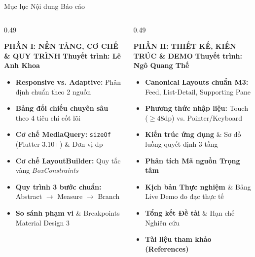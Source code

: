 \documentclass[aspectratio=169, 10pt]{beamer}
\begin{document}
\begin{frame}{Mục lục Nội dung Báo cáo}
  \vspace{-0.15cm}
  \begin{columns}[t,onlytextwidth]
    \begin{column}{0.49\textwidth}
      \begin{block}{\textbf{PHẦN I: NỀN TẢNG, CƠ CHẾ \& QUY TRÌNH}}
        \footnotesize
        \textbf{Thuyết trình: Lê Anh Khoa}
        \begin{itemize}\setlength{\itemsep}{1.8pt}
          \item \textbf{Responsive vs. Adaptive:} Phân định chuẩn theo 2 nguồn
          \item \textbf{Bảng đối chiếu chuyên sâu} theo 4 tiêu chí cốt lõi
          \item \textbf{Cơ chế MediaQuery:} \texttt{sizeOf} (Flutter 3.10+) \& Đơn vị dp
          \item \textbf{Cơ chế LayoutBuilder:} Quy tắc vàng \textit{BoxConstraints}
          \item \textbf{Quy trình 3 bước chuẩn:} Abstract $\rightarrow$ Measure $\rightarrow$ Branch
          \item \textbf{So sánh phạm vi} \& Breakpoints Material Design 3
        \end{itemize}
      \end{block}
    \end{column}

    \begin{column}{0.49\textwidth}
      \begin{block}{\textbf{PHẦN II: THIẾT KẾ, KIẾN TRÚC \& DEMO}}
        \footnotesize
        \textbf{Thuyết trình: Ngô Quang Thế}
        \begin{itemize}\setlength{\itemsep}{1.8pt}
          \item \textbf{Canonical Layouts chuẩn M3:} Feed, List-Detail, Supporting Pane
          \item \textbf{Phương thức nhập liệu:} Touch ($\ge 48\text{dp}$) vs. Pointer/Keyboard
          \item \textbf{Kiến trúc ứng dụng} \& Sơ đồ luồng quyết định 3 tầng
          \item \textbf{Phân tích Mã nguồn Trọng tâm}
          \item \textbf{Kịch bản Thực nghiệm} \& Bảng Live Demo đo đạc thực tế
          \item \textbf{Tổng kết Đề tài} \& Hạn chế Nghiên cứu
          \item \textbf{Tài liệu tham khảo (References)}
        \end{itemize}
      \end{block}
    \end{column}
  \end{columns}
\end{frame}
\end{document}
